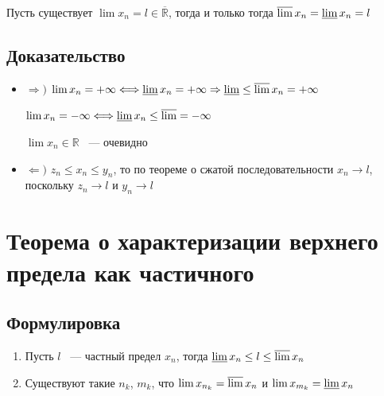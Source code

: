 \documentclass{article}
\begin{document}
            Пусть существует $\lim x_n = l \in \overline{\mathbb{R}}$, тогда и только тогда $\varlimsup x_n = \varliminf x_n = l$
            
        \subsection{Доказательство}
        
            \begin{itemize}
            
                \item $\Rightarrow)$ $\lim x_n = +\infty \Longleftrightarrow \varliminf x_n = +\infty \Rightarrow \varliminf \leq \varlimsup x_n = +\infty$
                
                    $\lim x_n = -\infty \Longleftrightarrow \varliminf x_n \leq \varlimsup = -\infty$
                    
                    $\lim x_n \in \mathbb{R}$ ~--- очевидно
                    
                \item $\Leftarrow)$ $z_n \leq x_n \leq y_n$, то по теореме о сжатой последовательности $x_n \rightarrow l$, поскольку $z_n \rightarrow l$ и $y_n \rightarrow l$
                
            \end{itemize}
        
    \newpage
    
    \section{Теорема о характеризации верхнего предела как частичного}
    
        \subsection{Формулировка}
            
            \begin{enumerate}
            
                \item Пусть $l$ ~--- частный предел $x_n$, тогда $\varliminf x_n \leq l \leq \varlimsup x_n$
                
                \item Существуют такие $n_k$, $m_k$, что $\lim x_{n_k} = \varlimsup x_n$ и $\lim x_{m_k} = \varliminf x_n$
                
            \end{enumerate}
            
\end{document}

